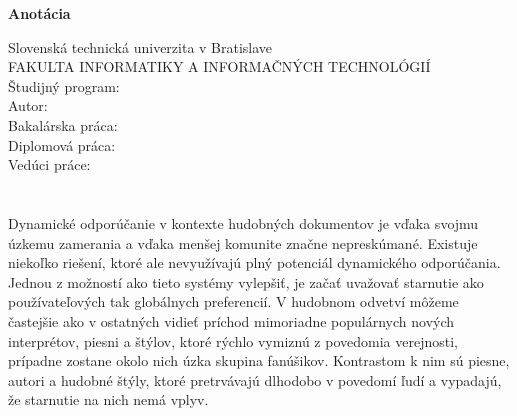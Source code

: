 \newpage
\newpage\null\thispagestyle{empty}\newpage
\thispagestyle{plain}
\begin{center}
\begin{Large}
\textbf{Anotácia} \\
\end{Large}
\end{center}
Slovenská technická univerzita v Bratislave \\
FAKULTA INFORMATIKY A INFORMAČNÝCH TECHNOLÓGIÍ \\
\noindent
Študijný program: \Program \\
\noindent
Autor: \Author \\
{
    {Bakalárska práca: }\Title \\
}
{
    {Diplomová práca: }\Title \\
}
Vedúci práce: \Supervisor \\
\Month{ }\Year \\
\noindent
\\
Dynamické odporúčanie v kontexte hudobných dokumentov je vďaka svojmu úzkemu zamerania a vďaka menšej komunite značne nepreskúmané. Existuje niekoľko riešení, ktoré ale nevyužívajú plný potenciál dynamického odporúčania. Jednou z možností ako tieto systémy vylepšiť, je začať uvažovať starnutie ako používateľových tak globálnych preferencií. V hudobnom odvetví môžeme častejšie ako v ostatných vidieť príchod mimoriadne populárnych nových interprétov, piesni a štýlov, ktoré rýchlo vymiznú z povedomia verejnosti, prípadne zostane okolo nich úzka skupina fanúšikov. Kontrastom k nim sú piesne, autori a hudobné štýly, ktoré pretrvávajú dlhodobo v povedomí ľudí a vypadajú, že starnutie na nich nemá vplyv. \newpage

